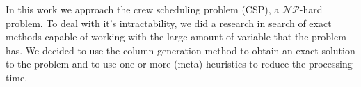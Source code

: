 In this work we approach the crew scheduling problem (CSP), a $\mathcal{NP}$-hard problem.
To deal with it's intractability, we did a research in search of exact methods capable of
working with the large amount of variable that the problem has. We decided to use the
column generation method to obtain an exact solution to the problem and to use
one or more (meta) heuristics to reduce the processing time.
